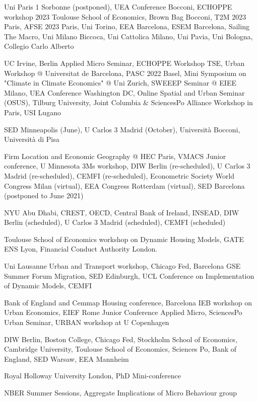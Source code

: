 \documentclass[letterpaper]{article}
\renewenvironment{itemize}{
  \begin{list}{}{
    \setlength{\leftmargin}{1.5em}
  }
}{
  \end{list}
}
\begin{document}
\begin{itemize}
\item[2023:] Uni Paris 1 Sorbonne (postponed), UEA Conference Bocconi, ECHOPPE workshop 2023 Toulouse School of Economics, Brown Bag Bocconi, T2M 2023 Paris, AFSE 2023 Paris, Uni Torino, EEA Barcelona, ESEM Barcelona, Sailing The Macro, Uni Milano Biccoca, Uni Cattolica Milano, Uni Pavia, Uni Bologna, Collegio Carlo Alberto
\item[2022:] UC Irvine, Berlin Applied Micro Seminar, ECHOPPE Workshop TSE, Urban Workshop @ Universitat de Barcelona, PASC 2022 Basel, Mini Symposium on "Climate in Climate Economics" @ Uni Zurich, SWEEEP Seminar @ EIEE Milano, UEA Conference Washington DC, Online Spatial and Urban Seminar (OSUS), Tilburg University, Joint Columbia \& SciencesPo Alliance Workshop in Paris, USI Lugano    
\item[2021:] SED Minneapolis (June), U Carlos 3 Madrid (October), Università Bocconi, Università di Pisa
\item[2020:] Firm Location and Economic Geography @ HEC Paris, VMACS Junior conference, U Minnesota 3Ms workshop, DIW Berlin (re-scheduled), U Carlos 3 Madrid (re-scheduled), CEMFI (re-scheduled), Econometric Society World Congress Milan (virtual), EEA Congress Rotterdam (virtual), SED Barcelona (postponed to June 2021)
\item[2019:] NYU Abu Dhabi, CREST, OECD, Central Bank of Ireland, INSEAD, DIW Berlin (scheduled), U Carlos 3 Madrid (scheduled), CEMFI (scheduled)
\item[2018:] Toulouse School of Economics workshop on Dynamic Housing Models, GATE ENS Lyon, Financial Conduct Authority London.
\item[2017:] Uni Lausanne Urban and Transport workshop, Chicago Fed, Barcelona GSE Summer Forum Migration, SED Edinburgh, UCL Conference on Implementation of Dynamic Models, CEMFI
\item[2016:] Bank of England and Cemmap Housing conference, Barcelona IEB workshop on Urban Economics, EIEF Rome Junior Conference Applied Micro, SciencesPo Urban Seminar, URBAN workshop at U Copenhagen
\item[2015:] DIW Berlin, Boston College, Chicago Fed, Stockholm School of Economics, Cambridge University, Toulouse School of Economics, Sciences Po, Bank of England, SED Warsaw, EEA Mannheim
\item[2014:] Royal Holloway University London, PhD Mini-conference
\item[2013:] NBER Summer Sessions, Aggregate Implications of Micro Behaviour group
\end{itemize}
\end{document}
